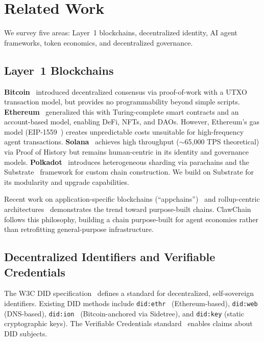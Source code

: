 \documentclass{article}
\begin{document}

\section{Related Work}\label{sec:related}

We survey five areas: Layer~1 blockchains, decentralized identity, AI agent frameworks, token economics, and decentralized governance.

\subsection{Layer~1 Blockchains}

\textbf{Bitcoin}~\cite{nakamoto2008bitcoin} introduced decentralized consensus via proof-of-work with a UTXO transaction model, but provides no programmability beyond simple scripts. \textbf{Ethereum}~\cite{buterin2014ethereum} generalized this with Turing-complete smart contracts and an account-based model, enabling DeFi, NFTs, and DAOs. However, Ethereum's gas model (EIP-1559~\cite{roughgarden2021eip1559}) creates unpredictable costs unsuitable for high-frequency agent transactions. \textbf{Solana}~\cite{yakovenko2018solana} achieves high throughput ($\sim$65,000 TPS theoretical) via Proof of History but remains human-centric in its identity and governance models. \textbf{Polkadot}~\cite{wood2016polkadot} introduces heterogeneous sharding via parachains and the Substrate~\cite{parity_substrate} framework for custom chain construction. We build on Substrate for its modularity and upgrade capabilities.

Recent work on application-specific blockchains (``appchains'')~\cite{cosmos_sdk} and rollup-centric architectures~\cite{thibault2022rollups} demonstrates the trend toward purpose-built chains. ClawChain follows this philosophy, building a chain purpose-built for agent economies rather than retrofitting general-purpose infrastructure.

\subsection{Decentralized Identifiers and Verifiable Credentials}

The W3C DID specification~\cite{w3c_did_2022} defines a standard for decentralized, self-sovereign identifiers. Existing DID methods include \texttt{did:ethr}~\cite{did_ethr} (Ethereum-based), \texttt{did:web} (DNS-based), \texttt{did:ion}~\cite{sidetree} (Bitcoin-anchored via Sidetree), and \texttt{did:key} (static cryptographic keys). The Verifiable Credentials standard~\cite{w3c_vc_2022} enables claims about DID subjects.
\end{document}
